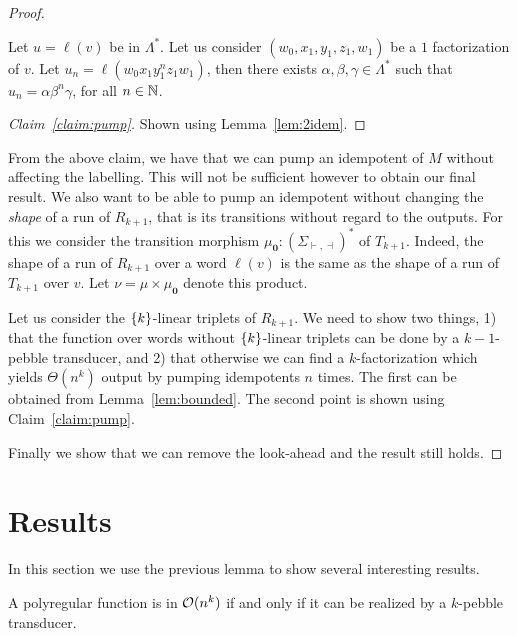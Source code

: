 \begin{proof}
    \begin{claim}\label{claim:pump}
        Let $u=\ell(v)$ be in $ \Lambda^*$.
        Let us consider $(w_0,x_1,y_1,z_1,w_1)$ be a $1$ factorization of $v$.
        Let $u_n=\ell(w_0x_1y_1^nz_1w_1)$, then there exists $\alpha,\beta,\gamma\in \Lambda^*$ such that $u_n=\alpha\beta^n\gamma$, for all $n\in \mathbb{N}$.
    \end{claim}
\begin{proof}[Claim~\ref{claim:pump}]
    Shown using Lemma~\ref{lem:2idem}.
\end{proof}
From the above claim, we have that we can pump an idempotent of $M$ without affecting the labelling.
This will not be sufficient however to obtain our final result. We also want to be able to pump an idempotent without changing the \emph{shape} of a run of $R_{k+1}$, that is its transitions without regard to the outputs.
For this we consider the transition morphism $\mu_{\mathbf 0}:(\Sigma_{\vdash,\dashv})^*$ of $T_{k+1}$. Indeed, the shape of a run of $R_{k+1}$ over a word $\ell(v)$ is the same as the shape of a run of $T_{k+1}$ over $v$.
Let $\nu=\mu\times \mu_{\mathbf 0}$ denote this product.

Let us consider the $\{k\}$-linear triplets of $R_{k+1}$.
We need to show two things, 1) that the function over words without $\{k\}$-linear triplets can be done by a $k{-}1$-pebble transducer, and 2) that otherwise we can find a $k$-factorization which yields $\Theta(n^k)$ output by pumping idempotents $n$ times.
The first can be obtained from Lemma~\ref{lem:bounded}. The second point is shown using Claim~\ref{claim:pump}.

Finally we show that we can remove the look-ahead and the result still holds.
\end{proof}

\section{Results}

In this section we use the previous lemma to show several interesting results.
\begin{theorem}
    \label{thm:onk}
    A polyregular function is in ${\mathcal O}(n^k)$ if and only if it can be realized by a $k$-pebble transducer.
\end{theorem}

